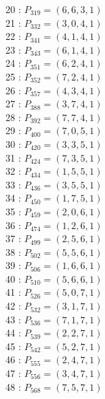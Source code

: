 \documentclass{article}
\begin{document}
{\begin{multicols}{2}
20 : $P_{319}=( 6, 6, 3, 1 )$\\
21 : $P_{332}=( 3, 0, 4, 1 )$\\
22 : $P_{341}=( 4, 1, 4, 1 )$\\
23 : $P_{343}=( 6, 1, 4, 1 )$\\
24 : $P_{351}=( 6, 2, 4, 1 )$\\
25 : $P_{352}=( 7, 2, 4, 1 )$\\
26 : $P_{357}=( 4, 3, 4, 1 )$\\
27 : $P_{388}=( 3, 7, 4, 1 )$\\
28 : $P_{392}=( 7, 7, 4, 1 )$\\
29 : $P_{400}=( 7, 0, 5, 1 )$\\
30 : $P_{420}=( 3, 3, 5, 1 )$\\
31 : $P_{424}=( 7, 3, 5, 1 )$\\
32 : $P_{434}=( 1, 5, 5, 1 )$\\
33 : $P_{436}=( 3, 5, 5, 1 )$\\
34 : $P_{450}=( 1, 7, 5, 1 )$\\
35 : $P_{459}=( 2, 0, 6, 1 )$\\
36 : $P_{474}=( 1, 2, 6, 1 )$\\
37 : $P_{499}=( 2, 5, 6, 1 )$\\
38 : $P_{502}=( 5, 5, 6, 1 )$\\
39 : $P_{506}=( 1, 6, 6, 1 )$\\
40 : $P_{510}=( 5, 6, 6, 1 )$\\
41 : $P_{526}=( 5, 0, 7, 1 )$\\
42 : $P_{532}=( 3, 1, 7, 1 )$\\
43 : $P_{536}=( 7, 1, 7, 1 )$\\
44 : $P_{539}=( 2, 2, 7, 1 )$\\
45 : $P_{542}=( 5, 2, 7, 1 )$\\
46 : $P_{555}=( 2, 4, 7, 1 )$\\
47 : $P_{556}=( 3, 4, 7, 1 )$\\
48 : $P_{568}=( 7, 5, 7, 1 )$\\
\end{multicols}
}
\end{document}
